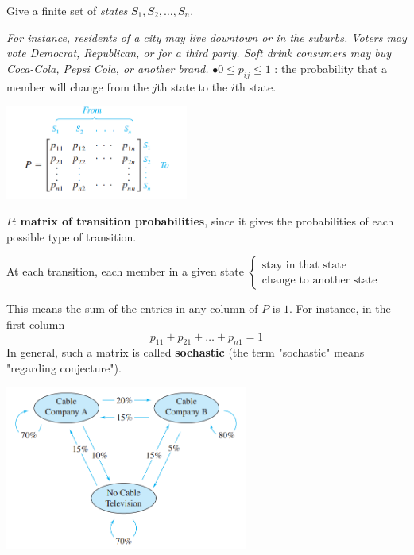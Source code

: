 \documentclass{article}
\newcounter{example}[section]
\newcommand\B{\textbf}
\begin{document}
    Give a finite set of \textit{states} ${S_1, S_2, \dots, S_n}$.\\
    {\footnotesize \textit{For instance, residents of a city may live downtown or in the suburbs. Voters may vote Democrat, Republican, or for a third party. Soft drink consumers may buy Coca-Cola, Pepsi Cola, or another brand.}
    $\bullet 0 \leq p_{ij} \leq 1$ : the probability that a member will change from the $j$th state to the $i$th state.
    
    \begin{center}
    \includegraphics[width = 6cm]{ptransition.png}
    \end{center}

    $P$: \B{matrix of transition probabilities}, since it gives the probabilities of each possible type
    of transition.

    At each transition, each member in a given state $ \begin{cases}{}
        \text{stay in that state} \\ \text{change to another state}
    \end{cases}$

    This means the sum of the entries in any column of $P$ is $1$. For instance, in the first column
    \[ p_{11} + p_{21} + \dots + p_{n1} = 1 \]
    In general, such a matrix is called \B{sochastic} (the term "sochastic" means "regarding conjecture").

    \begin{center}
        \includegraphics[width = 8cm]{cableexample.png}
    \end{center}

}
\end{document}

